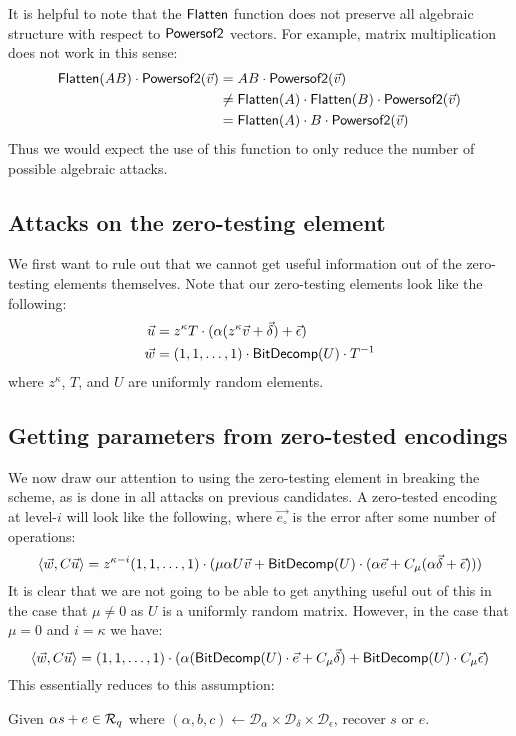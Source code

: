 It is helpful to note that the $\mathsf{Flatten}$ function does not preserve all algebraic structure with respect to $\mathsf{Powersof2}$ vectors.  For example, matrix multiplication does not work in this sense:
\begin{align*}
\mathsf{Flatten}(AB)\cdot \mathsf{Powersof2}(\vec{v}) &= AB \cdot \mathsf{Powersof2}(\vec{v})\\
&\not= \mathsf{Flatten}(A)\cdot \mathsf{Flatten}(B)\cdot \mathsf{Powersof2}(\vec{v})\\ 
&= \mathsf{Flatten}(A)\cdot B\cdot \mathsf{Powersof2}(\vec{v})
\end{align*}
Thus we would expect the use of this function to only reduce the number of possible algebraic attacks.

\subsection{Attacks on the zero-testing element}

We first want to rule out that we cannot get useful information out of the zero-testing elements themselves.  Note that our zero-testing elements look like the following:
\begin{align*}
\vec{u} &= z^\kappa T\cdot (\alpha (z^\kappa \vec{v} + \vec{\delta}) + \vec{\epsilon})\\
\vec{w} &= (1,1,\ldots, 1)\cdot\mathsf{BitDecomp}(U)\cdot T^{-1}
\end{align*}
where $z^\kappa$, $T$, and $U$ are uniformly random elements.

\subsection{Getting parameters from zero-tested encodings}

We now draw our attention to using the zero-testing element in breaking the scheme, as is done in all attacks on previous candidates.  A zero-tested encoding at level-$i$ will look like the following, where $\vec{e_{\circ}}$ is the error after some number of operations:
$$\left<\vec{w}, C \vec{u}\right> = z^{\kappa-i}(1,1,\ldots,1)\cdot(\mu\alpha U \vec{v} + \mathsf{BitDecomp}(U)\cdot (\alpha\vec{e} + C_\mu(\alpha\vec{\delta} + \vec{\epsilon})))$$
It is clear that we are not going to be able to get anything useful out of this in the case that $\mu \not= 0$ as $U$ is a uniformly random matrix.  However, in the case that $\mu = 0$ and $i = \kappa$ we have:
\begin{equation}\label{eq:topleveltested}
\left<\vec{w}, C \vec{u}\right> = (1,1,\ldots,1)\cdot(\alpha (\mathsf{BitDecomp}(U)\cdot \vec{e} + C_\mu\vec{\delta}) + \mathsf{BitDecomp}(U)\cdot C_\mu\vec{\epsilon})
\end{equation}
This essentially reduces to this assumption:
\begin{assumption}
\label{rlwevar}
Given $\alpha s + e \in \mathcal{R}_q$ where $(\alpha, b, c) \leftarrow \mathcal{D}_\alpha \times \mathcal{D}_\delta \times \mathcal{D}_\epsilon$, recover $s$ or $e$.
\end{assumption}

